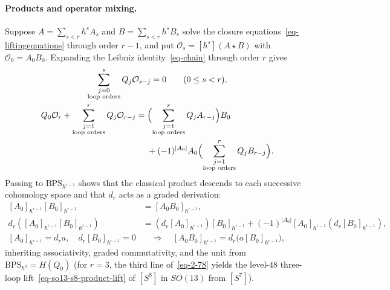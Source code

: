 \documentclass[11pt]{article}
\numberwithin{equation}{section}
\numberwithin{figure}{section}
\numberwithin{table}{section}
\begin{document}
\paragraph{Products and operator mixing.}\label{products-and-classical-representatives}
\label{b-00716}\label{b-00718}\label{b-00720}%
Suppose $A=\sum_{s<r}\hbar^sA_s$ and $B=\sum_{s<r}\hbar^sB_s$ solve the closure equations~\eqref{eq-liftingequations} through order $r-1$, and put $\mathcal O_s=[\hbar^s](A\star B)$ with $\mathcal O_0=A_0B_0$. Expanding the Leibniz identity~\eqref{eq-chain} through order $r$ gives
\begin{equation}\label{eq-2-77}
\begin{gathered}
\sum_{\substack{j=0\\\text{loop orders}}}^{s}Q_j\mathcal O_{s-j}=0\qquad(0\le s<r),\\
\begin{aligned}
Q_0\mathcal O_r+\sum_{\substack{j=1\\\text{loop orders}}}^{r}Q_j\mathcal O_{r-j}
={}&\Bigl(\sum_{\substack{j=1\\\text{loop orders}}}^{r}Q_jA_{r-j}\Bigr)B_0\\
&+(-1)^{|A_0|}A_0\Bigl(\sum_{\substack{j=1\\\text{loop orders}}}^{r}Q_jB_{r-j}\Bigr).
\end{aligned}
\end{gathered}
\end{equation}
Passing to $\mathrm{BPS}_{\hbar^{r-1}}$ shows that the classical product descends to each successive cohomology space and that $d_r$ acts as a graded derivation:
\begin{equation}\label{eq-2-78}
\begin{aligned}
[A_0]_{\hbar^{r-1}}[B_0]_{\hbar^{r-1}}&=[A_0B_0]_{\hbar^{r-1}},\\
d_r([A_0]_{\hbar^{r-1}}[B_0]_{\hbar^{r-1}})
&=(d_r[A_0]_{\hbar^{r-1}})[B_0]_{\hbar^{r-1}}+(-1)^{|A_0|}[A_0]_{\hbar^{r-1}}(d_r[B_0]_{\hbar^{r-1}}),\\
[A_0]_{\hbar^{r-1}}=d_ra,\quad d_r[B_0]_{\hbar^{r-1}}=0
&\quad\Longrightarrow\quad [A_0B_0]_{\hbar^{r-1}}=d_r\bigl(a[B_0]_{\hbar^{r-1}}\bigr),
\end{aligned}
\end{equation}
inheriting associativity, graded commutativity, and the unit from $\mathrm{BPS}_{\hbar^0}=H(Q_0)$ (for $r=3$, the third line of~\eqref{eq-2-78} yields the level-$48$ three-loop lift~\eqref{eq-so13-s8-product-lift} of $[S^8]$ in $SO(13)$ from $[S^7]$).
\end{document}
